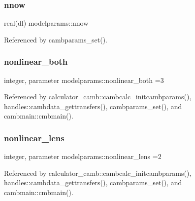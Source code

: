 \mbox{\label{namespacemodelparams_a75f2e158664252c3e9cf88ad48570e99}} 
\subsubsection{\texorpdfstring{nnow}{nnow}}
{\footnotesize\ttfamily real(dl) modelparams\+::nnow}



Referenced by cambparams\+\_\+set().

\mbox{\label{namespacemodelparams_a44142a84e66f3bd7d9feebe2abd22160}} 
\subsubsection{\texorpdfstring{nonlinear\+\_\+both}{nonlinear\_both}}
{\footnotesize\ttfamily integer, parameter modelparams\+::nonlinear\+\_\+both =3}



Referenced by calculator\+\_\+camb\+::cambcalc\+\_\+initcambparams(), handles\+::cambdata\+\_\+gettransfers(), cambparams\+\_\+set(), and cambmain\+::cmbmain().

\mbox{\label{namespacemodelparams_a0f2c57977e2bc614225a5776fbcd1efa}} 
\subsubsection{\texorpdfstring{nonlinear\+\_\+lens}{nonlinear\_lens}}
{\footnotesize\ttfamily integer, parameter modelparams\+::nonlinear\+\_\+lens =2}



Referenced by calculator\+\_\+camb\+::cambcalc\+\_\+initcambparams(), handles\+::cambdata\+\_\+gettransfers(), cambparams\+\_\+set(), and cambmain\+::cmbmain().

\mbox{\label{namespacemodelparams_a2e14a764fa10ffaa74cc53471510c99b}} 
